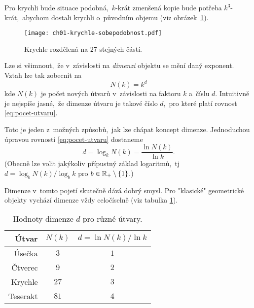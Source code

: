 Pro krychli bude situace podobná,~$k$-krát zmenšená kopie bude potřeba $k^3$-krát,~abychom dostali krychli o~původním objemu (viz obrázek~\ref{fig:krychle-sobepodobnost}).
\begin{figure}[h]
    \centering
    \texttt{[image: ch01-krychle-sobepodobnost.pdf]}
    \caption{Krychle rozdělená na 27 stejných částí.}
    \label{fig:krychle-sobepodobnost}
\end{figure}
Lze si všimnout,~že v~závislosti na \emph{dimenzi} objektu se mění daný exponent. Vztah lze tak zobecnit na
\begin{equation}\label{eq:pocet-utvaru}
    N(k)=k^d
\end{equation}
kde $N(k)$ je počet nových útvarů v~závislosti na faktoru $k$ a~číslu $d$. Intuitivně je nejspíše jasné,~že dimenze útvaru je takové číslo $d$,~pro které platí rovnost \eqref{eq:pocet-utvaru}.

Toto je jeden z~možných způsobů,~jak lze chápat koncept dimenze. Jednoduchou úpravou rovnosti \eqref{eq:pocet-utvaru} dostaneme
\[d=\log_k{N(k)}=\dfrac{\ln{N(k)}}{\ln{k}}.\]
(Obecně lze volit jakýkoliv přípustný základ logaritmů,~tj $d=\log_b{N(k)}/\log_b{k}$ pro $b\in\mathbb{R}_+\setminus\left\{1\right\}$.)

Dimenze v~tomto pojetí skutečně dává dobrý smysl. Pro "klasické" geometrické objekty vychází dimenze vždy celočíselně (viz tabulka \ref{table:eukleides-dimenze}).
\begin{table}[h]
    \centering
    \begin{tabular}{r|cc}
    Útvar    & $N(k)$ & $d=\ln{N(k)}/\ln{k}$ \\ \hline
    Úsečka   & $3$      & $1$                          \\
    Čtverec  & $9$      & $2$                          \\
    Krychle  & $27$     & $3$                          \\
    Teserakt & $81$     & $4$                          \\
    \end{tabular}
    \caption{Hodnoty dimenze $d$ pro různé útvary.}
    \label{table:eukleides-dimenze}
\end{table}

